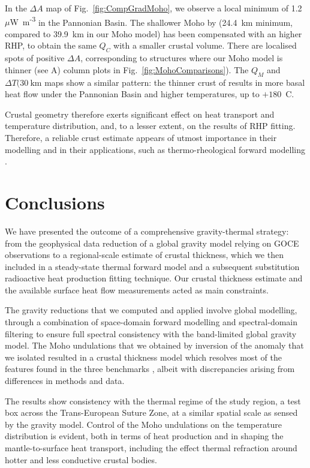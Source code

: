 {In the $\Delta A$ map of Fig.~\ref{fig:CompGradMoho}, we observe a local minimum of 1.2~{$\mu$W~m\textsuperscript{-3}} in the Pannonian Basin.
The shallower Moho by \textcite{Grad2009} (24.4~km minimum, compared to 39.9~km in our Moho model) has been compensated with an higher RHP, to obtain the same $Q_C$ with a smaller crustal volume.
There are localised spots of positive $\Delta A$, corresponding to structures where our Moho model is thinner (see A) column plots in Fig.~\ref{fig:MohoComparisons}).
The $Q_M$ and $\Delta T(30~\mathrm{km}$ maps show a similar pattern: the thinner crust of \textcite{Grad2009} results in more basal heat flow under the Pannonian Basin and higher temperatures, up to $+180$~\textdegree C.

Crustal geometry therefore exerts significant effect on heat transport and temperature distribution, and, to a lesser extent, on the results of RHP fitting.
Therefore, a reliable crust estimate appears of utmost importance in their modelling and in their applications, such as thermo-rheological forward modelling \parencite[e.g. ][]{Burov1995}.

\section{Conclusions}
\label{s:Appl:Concl}

We have presented the outcome of a comprehensive gravity-thermal strategy: from the geophysical data reduction of a global gravity model relying on GOCE observations to a regional-scale estimate of crustal thickness, which we then included in a steady-state thermal forward model and a subsequent substitution radioactive heat production fitting technique.
Our crustal thickness estimate and the available surface heat flow measurements acted as main constraints.

The gravity reductions that we computed and applied involve global modelling, through a combination of space-domain forward modelling and spectral-domain filtering to ensure full spectral consistency with the band-limited global gravity model.
The Moho undulations that we obtained by inversion of the anomaly that we isolated resulted in a crustal thickness model which resolves most of the features found in the three benchmarks \parencites{Grad2009}{Reguzzoni2015}{Pasyanos2014}, albeit with discrepancies arising from differences in methods and data.

The results show consistency with the thermal regime of the study region, a test box across the Trans-European Suture Zone, at a similar spatial scale as sensed by the gravity model.
Control of the Moho undulations on the temperature distribution is evident, both in terms of heat production and in shaping the mantle-to-surface heat transport, including the effect thermal refraction around hotter and less conductive crustal bodies.

}
